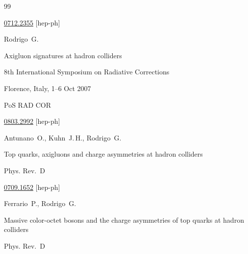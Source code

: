 \begin{thebibliography}{99}





\arxiv \href{http://arxiv.org/abs/0712.2355}{0712.2355} [hep-ph]





\by Rodrigo~G.

\paper Axigluon signatures at hadron colliders

\inbook $8$th International Symposium on Radiative Corrections

\procinfo Florence, Italy, 1--6 Oct 2007

\serial PoS RAD COR




\arxiv \href{http://arxiv.org/abs/0803.2992}{0803.2992} [hep-ph]






\by Antunano~O., Kuhn~J.\,H., Rodrigo~G.

\paper Top quarks, axigluons and charge asymmetries at hadron colliders

\jour Phys. Rev.~D






\arxiv \href{http://arxiv.org/abs/0709.1652}{0709.1652} [hep-ph]





\by Ferrario~P., Rodrigo~G.

\paper Massive color-octet bosons and the charge asymmetries of top quarks at hadron colliders

\jour Phys. Rev.~D




\end{thebibliography}
